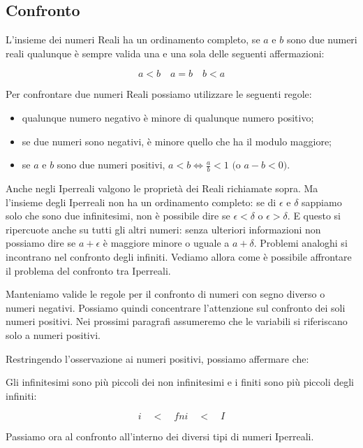 \subsection{Confronto}
\label{subsec:insnum_confronto}

L'insieme dei numeri Reali ha un ordinamento completo, se $a$ e $b$ sono due 
numeri reali qualunque è sempre valida una e una sola delle seguenti 
affermazioni:

\[a<b \quad a=b \quad b<a\]

Per confrontare due numeri Reali possiamo utilizzare le seguenti regole:

\begin{itemize} [noitemsep]
 \item qualunque numero negativo è minore di qualunque numero positivo;
 \item se due numeri sono negativi, è minore quello che ha il modulo maggiore;
 \item se $a$ e $b$ sono due numeri positivi, 
 $a<b \Leftrightarrow \frac{a}{b}<1 \text{ (o } a-b<0 \text{)}$.
\end{itemize}

Anche negli Iperreali valgono le proprietà dei Reali richiamate sopra. 
Ma l'insieme degli Iperreali non ha un ordinamento completo:
se di $\epsilon$ e $\delta$ sappiamo solo che sono due infinitesimi,
non è possibile dire se $\epsilon < \delta$ o $\epsilon > \delta$.
E questo si ripercuote anche su tutti gli altri numeri: senza ulteriori 
informazioni non possiamo dire se $a+\epsilon$ è maggiore minore o uguale 
a $a+\delta$. 
Problemi analoghi si incontrano nel confronto degli infiniti.
Vediamo allora come è possibile affrontare il problema del confronto tra 
Iperreali.

\begin{osservazione}
Manteniamo valide le regole per il confronto di numeri con segno diverso o 
numeri 
negativi. Possiamo quindi concentrare l'attenzione sul confronto dei soli 
numeri positivi.
Nei prossimi paragrafi assumeremo che le variabili si riferiscano solo a 
numeri 
positivi.
\end{osservazione}

Restringendo l'osservazione ai numeri positivi, possiamo affermare che:

Gli infinitesimi sono più piccoli dei non 
infinitesimi e i finiti sono più piccoli degli infiniti:

\[i \quad < \quad fni \quad < \quad I\]

Passiamo ora al confronto all'interno dei diversi tipi di numeri Iperreali.

